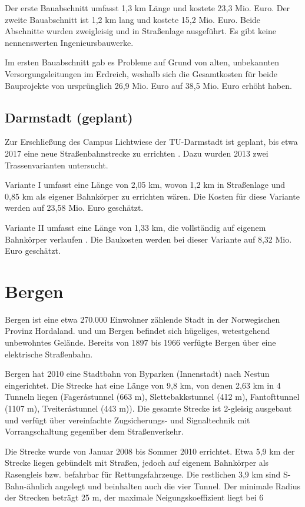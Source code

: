 Der erste Bauabschnitt umfasst 1,3 km Länge und kostete 23,3 Mio. Euro. Der
zweite Bauabschnitt ist 1,2 km lang und kostete 15,2 Mio. Euro. Beide Abschnitte
wurden zweigleisig und in Straßenlage ausgeführt. Es gibt keine nennenswerten
Ingenieursbauwerke.

Im ersten Bauabschnitt gab es Probleme auf Grund von alten, unbekannten
Versorgungsleitungen im Erdreich, weshalb sich die Gesamtkosten für beide
Bauprojekte von ursprünglich 26,9 Mio. Euro auf 38,5 Mio. Euro erhöht haben.

\subsection*{Darmstadt (geplant)}

Zur Erschließung des Campus Lichtwiese der TU-Darmstadt ist geplant, bis etwa
2017 eine neue Straßenbahnstrecke zu errichten \cite{mrDaLw}. Dazu wurden 2013
zwei Trassenvarianten untersucht.

Variante I umfasst eine Länge von 2,05 km, wovon 1,2 km in Straßenlage und 0,85
km als eigener Bahnkörper zu errichten wären. Die Kosten für diese Variante
werden auf 23,58 Mio.  Euro geschätzt.

Variante II umfasst eine Länge von 1,33 km, die vollständig auf eigenem
Bahnkörper verlaufen \cite{eoDaLw}.  Die Baukosten werden bei dieser Variante
auf 8,32 Mio. Euro geschätzt.

\section{Bergen}

Bergen ist eine etwa 270.000 Einwohner zählende Stadt in der Norwegischen
Provinz Hordaland.  und um Bergen befindet sich hügeliges, wetestgehend
unbewohntes Gelände. Bereits von 1897 bis 1966 verfügte Bergen über eine
elektrische Straßenbahn.

Bergen hat 2010 eine Stadtbahn von Byparken (Innenstadt) nach Nestun
eingerichtet. Die Strecke hat eine Länge von 9,8 km, von denen 2,63 km in 4
Tunneln liegen (Fageråstunnel (663 m), Slettebakkstunnel (412 m), Fantofttunnel
(1107 m), Tveiteråstunnel (443 m)). Die gesamte Strecke ist 2-gleisig ausgebaut
und verfügt über vereinfachte Zugsicherungs- und Signaltechnik mit
Vorrangschaltung gegenüber dem Straßenverkehr.

Die Strecke wurde von Januar 2008 bis Sommer 2010 errichtet. Etwa 5,9 km der
Strecke liegen gebündelt mit Straßen, jedoch auf eigenem Bahnkörper als
Rasengleis bzw. befahrbar für Rettungsfahrzeuge. Die restlichen 3,9 km sind
S-Bahn-ähnlich angelegt und beinhalten auch die vier Tunnel. Der minimale Radius
der Strecken beträgt 25 m, der maximale Neigungskoeffizient liegt bei 6%


